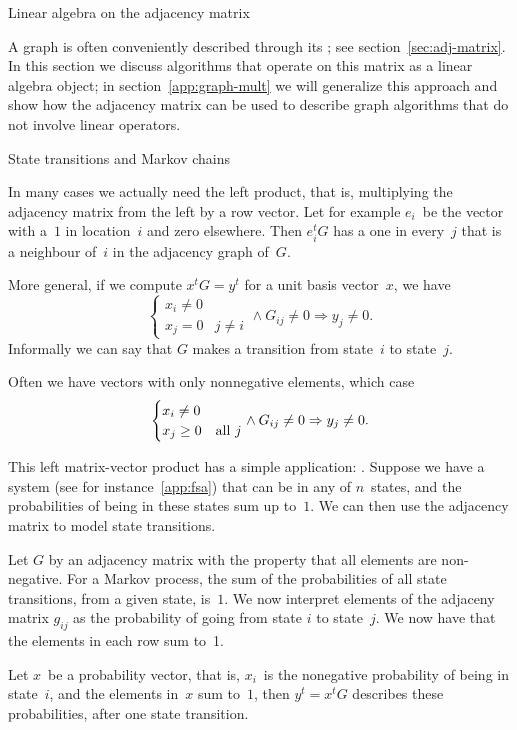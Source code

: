  {Linear algebra on the adjacency matrix}

A graph is often conveniently described through its
; see section~\ref{sec:adj-matrix}.
In this section we discuss algorithms that operate on this
matrix as a linear algebra object;
in section~\ref{app:graph-mult} we will generalize this approach
and show how the adjacency matrix can be used to describe graph
algorithms that do not involve linear operators.

 {State transitions and Markov chains}
\label{sec:markov-matrix}

In many cases we actually need the left product, that is, multiplying
the adjacency matrix from the left by a row vector. Let for example $e_i$~be 
the vector with a~$1$ in location~$i$ and zero elsewhere. Then $e_i^tG$
has a one in every~$j$ that is a neighbour of~$i$ in the adjacency graph of~$G$.

More general, if we compute $x^tG=y^t$ for a unit basis vector~$x$, we have
\[ 
\begin{cases} x_i\not=0 \\ x_j=0&j\not= i \end{cases}
\wedge G_{ij}\not=0 \Rightarrow y_j\not=0.
\]
Informally we can say that $G$ makes a transition from state~$i$ to state~$j$.

Often we have vectors with only nonnegative elements, which case
\[ 
\begin{cases} x_i\not=0 \\ x_j\geq 0&\hbox{all $j$} \end{cases}
\wedge G_{ij}\not=0 \Rightarrow y_j\not=0.
\]

This left matrix-vector product has a simple application: .
Suppose we have a system (see for instance~\ref{app:fsa}) that can be
in any of $n$~states, and the probabilities of being in these states sum up to~$1$.
We can then use the adjacency matrix to model
state transitions.

Let $G$ by an adjacency matrix with the property that all elements are
non-negative.
For a Markov process,
the sum of the probabilities of all state transitions,
from a given state, is~$1$.
We now interpret elements of the adjaceny matrix
$g_{ij}$ as the probability of going from state $i$ to state~$j$.
We now have that the elements in each row sum to~1.

Let $x$~be a probability vector, that is,
$x_i$~is the nonegative probability 
of being in state~$i$, and the elements in~$x$ sum to~$1$,
then $y^t=x^tG$ describes these probabilities,
after one state transition.

